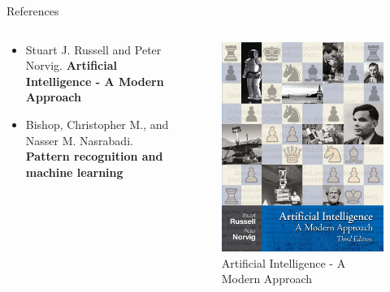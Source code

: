 \begin{frame}{References}
    \begin{columns}
        \begin{column}{0.5\textwidth}
            \begin{itemize}
                \item Stuart J. Russell and Peter Norvig. \textbf{Artificial Intelligence - A Modern Approach}
                \item Bishop, Christopher M., and Nasser M. Nasrabadi. \textbf{Pattern recognition and machine learning}
            \end{itemize}
        \end{column}

        \begin{column}{0.5\textwidth}
            \begin{figure}
                \includegraphics[width=0.6\linewidth]{img/ai.png}
                \caption{Artificial Intelligence - A Modern Approach}
            \end{figure}
        \end{column}
    \end{columns}
\end{frame}

